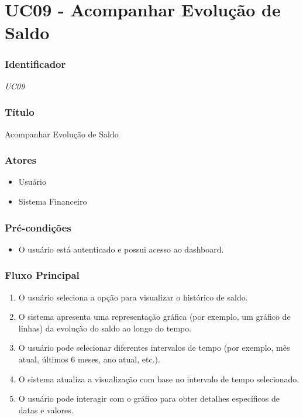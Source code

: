 \chapter{UC09 - Acompanhar Evolução de Saldo}
\label{apendiceUC09}

\subsection*{Identificador}
\textit{UC09}

\subsection*{Título}
Acompanhar Evolução de Saldo

\subsection*{Atores}
\begin{addmargin}[1.5cm]{0cm}
	\begin{itemize}
		\item Usuário
		\item Sistema Financeiro
	\end{itemize}
\end{addmargin}

\subsection*{Pré-condições}
\begin{addmargin}[1.5cm]{0cm}
	\begin{itemize}
		\item O usuário está autenticado e possui acesso ao dashboard.
	\end{itemize}
\end{addmargin}

\subsection*{Fluxo Principal}
\begin{addmargin}[1.5cm]{0cm}
	\begin{enumerate}
		\item O usuário seleciona a opção para visualizar o histórico de saldo.
		\item O sistema apresenta uma representação gráfica (por exemplo, um gráfico de linhas) da evolução do saldo ao longo do tempo.
		\item O usuário pode selecionar diferentes intervalos de tempo (por exemplo, mês atual, últimos 6 meses, ano atual, etc.).
		\item O sistema atualiza a visualização com base no intervalo de tempo selecionado.
		\item O usuário pode interagir com o gráfico para obter detalhes específicos de datas e valores.
	\end{enumerate}
\end{addmargin}

